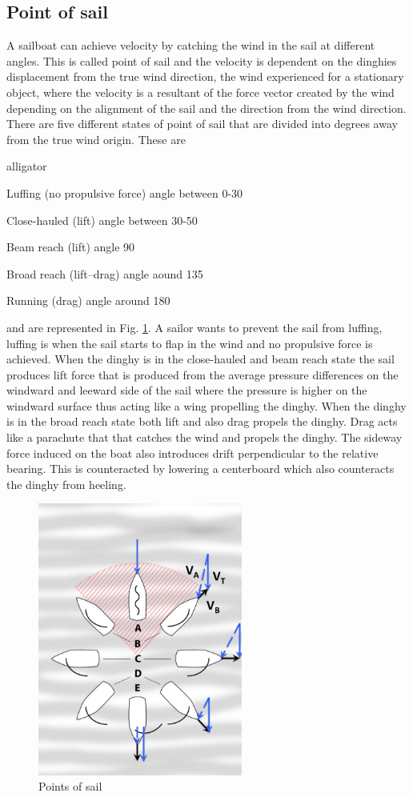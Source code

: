\subsection{Point of sail}
A sailboat can achieve velocity by catching the wind in the sail at different angles. This is called point of sail and the velocity is dependent on the dinghies displacement from the true wind direction, the wind experienced for a stationary object, where the velocity is a resultant of the force vector created by the wind depending on the alignment of the sail and the direction from the wind direction. There are five different states of point of sail that are divided into degrees away from the true wind origin. These are
\begin{labeling}{alligator}
\item [Luffing] (no propulsive force) angle between 0-30\degree
\item [Close-hauled] (lift) angle between 30-50\degree
\item [Beam reach] (lift) angle 90\degree
\item [Broad reach] (lift–drag) angle aound 135\degree
\item [Running] (drag) angle around 180\degree
\end{labeling}
and are represented in Fig. \ref{points-sail}. A sailor wants to prevent the sail from luffing, luffing is when the sail starts to flap in the wind and no propulsive force is achieved. When the dinghy is in the close-hauled and beam reach state the sail produces lift force that is produced from the average pressure differences on the windward and leeward side of the sail where the pressure is higher on the windward surface thus acting like a wing propelling the dinghy. When the dinghy is in the broad reach state both lift and also drag propels the dinghy. Drag acts like a parachute that that catches the wind and propels the dinghy. The sideway force induced on the boat also introduces drift perpendicular to the relative bearing. This is counteracted by lowering a centerboard which also counteracts the dinghy from heeling.
\begin{figure}[H]
\centering
\includegraphics[width=0.6\textwidth]{Figures/Points_of_sail.jpg}
\caption{Points of sail}
\label{points-sail}
\end{figure}
